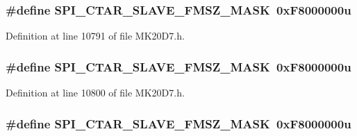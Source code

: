 \subsubsection[{\texorpdfstring{S\+P\+I\+\_\+\+C\+T\+A\+R\+\_\+\+S\+L\+A\+V\+E\+\_\+\+F\+M\+S\+Z\+\_\+\+M\+A\+SK}{SPI_CTAR_SLAVE_FMSZ_MASK}}]{\setlength{\rightskip}{0pt plus 5cm}\#define S\+P\+I\+\_\+\+C\+T\+A\+R\+\_\+\+S\+L\+A\+V\+E\+\_\+\+F\+M\+S\+Z\+\_\+\+M\+A\+SK~0x\+F8000000u}\hypertarget{group___s_p_i___register___masks_ga5230074b3809e2ef525e87fdca078717}{}\label{group___s_p_i___register___masks_ga5230074b3809e2ef525e87fdca078717}


Definition at line 10791 of file M\+K20\+D7.\+h.

\subsubsection[{\texorpdfstring{S\+P\+I\+\_\+\+C\+T\+A\+R\+\_\+\+S\+L\+A\+V\+E\+\_\+\+F\+M\+S\+Z\+\_\+\+M\+A\+SK}{SPI_CTAR_SLAVE_FMSZ_MASK}}]{\setlength{\rightskip}{0pt plus 5cm}\#define S\+P\+I\+\_\+\+C\+T\+A\+R\+\_\+\+S\+L\+A\+V\+E\+\_\+\+F\+M\+S\+Z\+\_\+\+M\+A\+SK~0x\+F8000000u}\hypertarget{group___s_p_i___register___masks_ga5230074b3809e2ef525e87fdca078717}{}\label{group___s_p_i___register___masks_ga5230074b3809e2ef525e87fdca078717}


Definition at line 10800 of file M\+K20\+D7.\+h.

\subsubsection[{\texorpdfstring{S\+P\+I\+\_\+\+C\+T\+A\+R\+\_\+\+S\+L\+A\+V\+E\+\_\+\+F\+M\+S\+Z\+\_\+\+M\+A\+SK}{SPI_CTAR_SLAVE_FMSZ_MASK}}]{\setlength{\rightskip}{0pt plus 5cm}\#define S\+P\+I\+\_\+\+C\+T\+A\+R\+\_\+\+S\+L\+A\+V\+E\+\_\+\+F\+M\+S\+Z\+\_\+\+M\+A\+SK~0x\+F8000000u}\hypertarget{group___s_p_i___register___masks_ga5230074b3809e2ef525e87fdca078717}{}\label{group___s_p_i___register___masks_ga5230074b3809e2ef525e87fdca078717}


